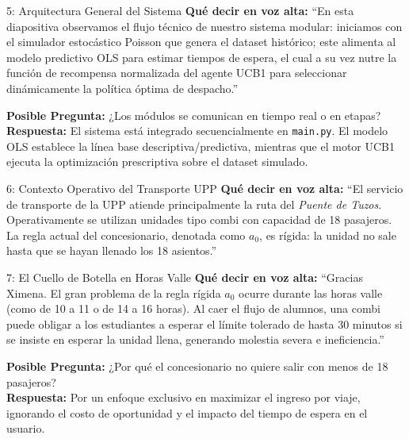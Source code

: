 \documentclass[11pt, a4paper]{article}
\begin{document}
\begin{ximenabox}{5: Arquitectura General del Sistema}
\textbf{Qué decir en voz alta:}
``En esta diapositiva observamos el flujo técnico de nuestro sistema modular: iniciamos con el simulador estocástico Poisson que genera el dataset histórico; este alimenta al modelo predictivo OLS para estimar tiempos de espera, el cual a su vez nutre la función de recompensa normalizada del agente UCB1 para seleccionar dinámicamente la política óptima de despacho.''

\begin{defensebox}
\textbf{Posible Pregunta:} ¿Los módulos se comunican en tiempo real o en etapas?\\
\textbf{Respuesta:} El sistema está integrado secuencialmente en \texttt{main.py}. El modelo OLS establece la línea base descriptiva/predictiva, mientras que el motor UCB1 ejecuta la optimización prescriptiva sobre el dataset simulado.
\end{defensebox}
\end{ximenabox}

\begin{ximenabox}{6: Contexto Operativo del Transporte UPP}
\textbf{Qué decir en voz alta:}
``El servicio de transporte de la UPP atiende principalmente la ruta del \textit{Puente de Tuzos}. Operativamente se utilizan unidades tipo combi con capacidad de 18 pasajeros. La regla actual del concesionario, denotada como $a_0$, es rígida: la unidad no sale hasta que se hayan llenado los 18 asientos.''
\end{ximenabox}

\begin{emmanuelbox}{7: El Cuello de Botella en Horas Valle}
\textbf{Qué decir en voz alta:}
``Gracias Ximena. El gran problema de la regla rígida $a_0$ ocurre durante las horas valle (como de 10 a 11 o de 14 a 16 horas). Al caer el flujo de alumnos, una combi puede obligar a los estudiantes a esperar el límite tolerado de hasta 30 minutos si se insiste en esperar la unidad llena, generando molestia severa e ineficiencia.''

\begin{defensebox}
\textbf{Posible Pregunta:} ¿Por qué el concesionario no quiere salir con menos de 18 pasajeros?\\
\textbf{Respuesta:} Por un enfoque exclusivo en maximizar el ingreso por viaje, ignorando el costo de oportunidad y el impacto del tiempo de espera en el usuario.
\end{defensebox}
\end{emmanuelbox}
\end{document}
